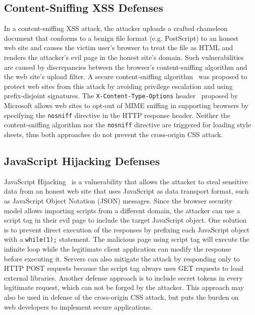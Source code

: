 \documentclass{acm_proc_article-sp}
\begin{document}
\subsection{Content-Sniffing XSS Defenses}
In a content-sniffing XSS attack, the attacker uploads a crafted chameleon
document that conforms to a benign file format (e.g. PostScript) to an honest
web site and causes the victim user's browser to treat the file as HTML and
renders the attacker's evil page in the honest site's domain. Such
vulnerabilities are caused by discrepancies between the browser's
content-sniffing algorithm and the web site's upload filter. A secure
content-sniffing algorithm~\cite{securecontentsniffing} was proposed to
protect web sites from this attack by avoiding privilege escalation and using
prefix-disjoint signatures. The \texttt{X-Content-Type-Options}
header~\cite{nosniff} proposed by Microsoft allows web sites to opt-out of
MIME sniffing in supporting browsers by specifying the \texttt{nosniff}
directive in the HTTP response header. Neither the content-sniffing algorithm
nor the \texttt{nosniff} directive are triggered for loading style sheets,
thus both approaches do not prevent the cross-origin CSS attack.

\subsection{JavaScript Hijacking Defenses}
JavaScript Hijacking~\cite{jshijacking} is a vulnerability that allows the
attacker to steal sensitive data from an honest web site that uses JavaScript
as data transport format, such as JavaScript Object Notation (JSON) messages.
Since the browser security model allows importing scripts from a different
domain, the attacker can use a script tag in their evil page to include the
target JavaScript object. One solution is to prevent direct
execution of the responses by prefixing each JavaScript object with a
\texttt{while(1);} statement. The malicious page using script tag will execute
the infinite loop while the legitimate client application can modify the
response before executing it. Servers can also mitigate the attack by responding only to HTTP POST requests because the script tag always uses GET requests to load external libraries. Another defense approach is to include secret tokens in every legitimate request, which can not be forged by the attacker.
This approach may also be used in defense of the cross-origin
CSS attack, but puts the burden on web developers to implement secure
applications.
\end{document}
